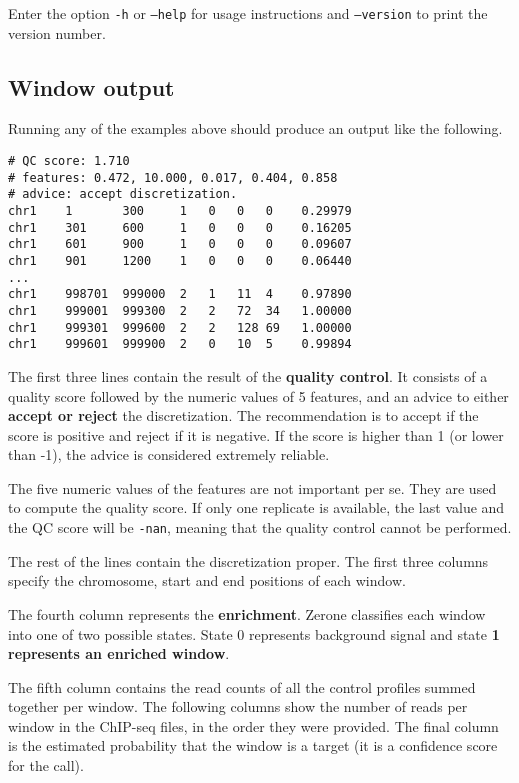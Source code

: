 \documentclass[12pt]{article}
\begin{document}
Enter the option \texttt{-h} or \texttt{--help} for usage instructions and
\texttt{--version} to print the version number.

\subsection{Window output}

Running any of the examples above should produce an output like
the following.

\begin{verbatim}
# QC score: 1.710
# features: 0.472, 10.000, 0.017, 0.404, 0.858
# advice: accept discretization.
chr1    1       300     1   0   0   0    0.29979
chr1    301     600     1   0   0   0    0.16205
chr1    601     900     1   0   0   0    0.09607
chr1    901     1200    1   0   0   0    0.06440
...
chr1    998701  999000  2   1   11  4    0.97890
chr1    999001  999300  2   2   72  34   1.00000
chr1    999301  999600  2   2   128 69   1.00000
chr1    999601  999900  2   0   10  5    0.99894
\end{verbatim}

\begin{mdframed}
The first three lines contain the result of the \textbf{quality control}.
It consists of a quality score followed by the numeric values of 5
features, and an advice to either \textbf{accept or reject} the
discretization. The recommendation is to accept if the score is positive
and reject if it is negative. If the score is higher than 1 (or lower
than -1), the advice is considered extremely reliable.
\end{mdframed}

The five numeric values of the features are not important per se.
They are used to compute the quality score. If only one replicate is
available, the last value and the QC score will be \texttt{-nan},
meaning that the quality control cannot be performed.

The rest of the lines contain the discretization proper.
The first three columns specify the chromosome, start and end
positions of each window.

\begin{mdframed}
The fourth column represents the \textbf{enrichment}. Zerone classifies
each window into one of two possible states. State 0 represents
background signal and state \textbf{1 represents an enriched window}.
\end{mdframed}

The fifth column contains the read counts of all the control profiles
summed together per window. The following columns show the number of
reads per window in the ChIP-seq files, in the order they were provided.
The final column is the estimated probability that the window is a
target (it is a confidence score for the call).
\end{document}
